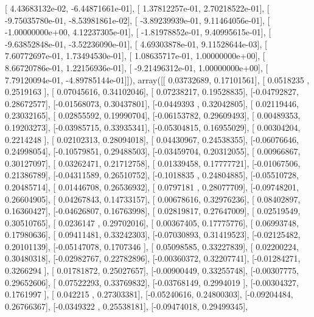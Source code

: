 \documentclass{article}
\begin{document}
       [  4.43683132e-02,  -6.44871661e-01],
       [  1.37812257e-01,   2.70218522e-01],
       [ -9.75035780e-01,  -8.53981861e-02],
       [ -3.89239939e-01,   9.11464056e-01],
       [ -1.00000000e+00,   4.12237305e-01],
       [ -1.81978852e-01,   9.40995615e-01],
       [ -9.63852848e-01,  -3.52236090e-01],
       [  4.69303878e-01,   9.11528644e-03],
       [  7.60772697e-01,   1.73494530e-01],
       [  1.08635717e-01,   1.00000000e+00],
       [  8.66720786e-01,   1.22156936e-01],
       [ -9.21496312e-01,   1.00000000e+00],
       [  7.79120094e-01,  -4.89785144e-01]]), array([[ 0.03732689,  0.17101561],
       [ 0.0518235 ,  0.2519163 ],
       [ 0.07045616,  0.34102046],
       [ 0.07238217,  0.19528835],
       [-0.04792827,  0.28672577],
       [-0.01568073,  0.30437801],
       [-0.0449393 ,  0.32042805],
       [ 0.02119446,  0.23032165],
       [ 0.02855592,  0.19990704],
       [-0.06153782,  0.29609493],
       [ 0.00489353,  0.19203273],
       [-0.03985715,  0.33935341],
       [-0.05304815,  0.16955029],
       [ 0.00304204,  0.2214248 ],
       [ 0.02102313,  0.28094018],
       [ 0.04430967,  0.24538355],
       [-0.06076646,  0.24998054],
       [-0.10579851,  0.29488503],
       [-0.03459704,  0.20312055],
       [ 0.00966867,  0.30127097],
       [ 0.03262471,  0.21712758],
       [ 0.01339458,  0.17777721],
       [-0.01067506,  0.21386789],
       [-0.04311589,  0.26510752],
       [-0.1018835 ,  0.24804885],
       [-0.05510728,  0.20485714],
       [ 0.01446708,  0.26536932],
       [ 0.0797181 ,  0.28077709],
       [-0.09748201,  0.26604905],
       [ 0.04267843,  0.14733157],
       [ 0.00678616,  0.32976236],
       [ 0.08402897,  0.16360427],
       [-0.04626807,  0.16763998],
       [ 0.02819817,  0.27647009],
       [ 0.02519549,  0.30510765],
       [ 0.0236147 ,  0.29702016],
       [ 0.00367405,  0.17775776],
       [ 0.06993748,  0.17980636],
       [ 0.09411481,  0.33242303],
       [-0.07030893,  0.31419523],
       [-0.02125482,  0.20101139],
       [-0.05147078,  0.1707346 ],
       [ 0.05098585,  0.33227839],
       [ 0.02200224,  0.30480318],
       [-0.02982767,  0.22782896],
       [-0.00360372,  0.32207741],
       [-0.01284271,  0.3266294 ],
       [ 0.01781872,  0.25027657],
       [-0.00900449,  0.33255748],
       [-0.00307775,  0.29652606],
       [ 0.07522293,  0.33769832],
       [-0.03768149,  0.2994019 ],
       [-0.00304327,  0.1761997 ],
       [ 0.042215  ,  0.27303381],
       [-0.05240616,  0.24800303],
       [-0.09204484,  0.26766367],
       [-0.0349322 ,  0.25538181],
       [-0.09474018,  0.29499345],
\end{document}
